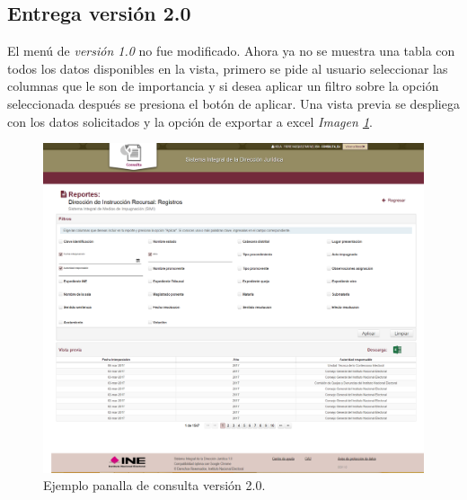 \documentclass[../reportesINE.tex]{subfiles}
\begin{document}
\subsection{Entrega versión 2.0}
El menú de \textit{versión 1.0} no fue modificado. Ahora ya no se muestra una tabla con todos los datos disponibles en la vista, primero se pide al usuario seleccionar las columnas que le son de importancia y si desea aplicar un filtro sobre la opción seleccionada después se presiona el botón de aplicar. Una vista previa se despliega con los datos solicitados y la opción de exportar a excel  \textit{Imagen \ref{fig:ejemploModuloCompleto}}.  

\begin{figure}[h]
  \centering
  \includegraphics[width=\linewidth]{img/ejemploModuloCompleto.png}
  \caption{Ejemplo panalla de consulta versión 2.0. }
  \label{fig:ejemploModuloCompleto}
\end{figure}
\end{document}
